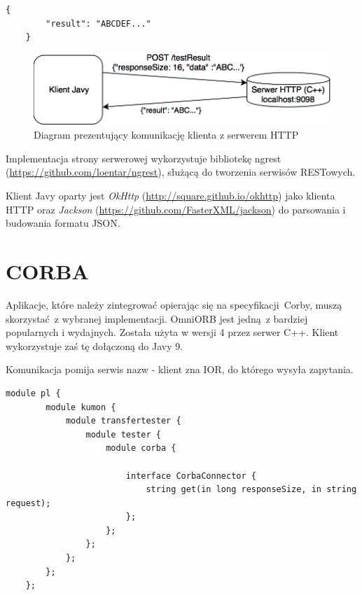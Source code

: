\begin{lstlisting}[caption={Format danych zwracany przez serwer},captionpos=b]
    {
        "result": "ABCDEF..."
    }
\end{lstlisting}

\begin{figure}[h!]
    \centering
    \includegraphics[width=\textwidth,height=\textheight,keepaspectratio]{img/rest_impl_diagram.png}
    \caption{Diagram prezentujący komunikację klienta z serwerem HTTP}
\end{figure}

Implementacja strony serwerowej wykorzystuje bibliotekę ngrest (\url{https://github.com/loentar/ngrest}), służącą do tworzenia serwisów RESTowych.

Klient Javy oparty jest \textit{OkHttp} (\url{http://square.github.io/okhttp}) jako klienta HTTP oraz \textit{Jackson} \newline (\url{https://github.com/FasterXML/jackson}) do parsowania i budowania formatu JSON.


\section{CORBA}

Aplikacje, które należy zintegrować opierając się na specyfikacji Corby, muszą skorzystać z wybranej implementacji. OmniORB jest jedną z bardziej popularnych i wydajnych. Została użyta w wersji 4 przez serwer C++. Klient wykorzystuje zaś tę dołączoną do Javy 9.

Komunikacja pomija serwis nazw - klient zna IOR, do którego wysyła zapytania.

\begin{lstlisting}[caption={Zastosowany interfejs (IDL)},captionpos=b]
    module pl {
        module kumon {
            module transfertester {
                module tester {
                    module corba {

                        interface CorbaConnector {
                            string get(in long responseSize, in string request);
                        };
                    };
                };
            };
        };
    };
\end{lstlisting}

